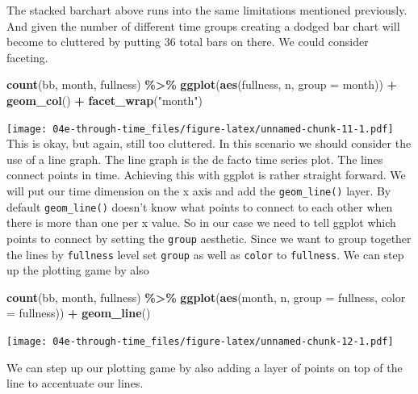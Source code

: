 \documentclass[
]{book}
\newenvironment{Shaded}{\begin{snugshade}}{\end{snugshade}}
\newcommand{\DataTypeTok}[1]{\textcolor[rgb]{0.13,0.29,0.53}{#1}}
\newcommand{\KeywordTok}[1]{\textcolor[rgb]{0.13,0.29,0.53}{\textbf{#1}}}
\newcommand{\NormalTok}[1]{#1}
\newcommand{\OperatorTok}[1]{\textcolor[rgb]{0.81,0.36,0.00}{\textbf{#1}}}
\newcommand{\StringTok}[1]{\textcolor[rgb]{0.31,0.60,0.02}{#1}}
\begin{document}
The stacked barchart above runs into the same limitations mentioned previously. And given the number of different time groups creating a dodged bar chart will become to cluttered by putting 36 total bars on there. We could consider faceting.

\begin{Shaded}
\begin{Highlighting}[]
\KeywordTok{count}\NormalTok{(bb, month, fullness) }\OperatorTok{\%\textgreater{}\%}\StringTok{ }
\StringTok{  }\KeywordTok{ggplot}\NormalTok{(}\KeywordTok{aes}\NormalTok{(fullness, n, }\DataTypeTok{group =}\NormalTok{ month)) }\OperatorTok{+}
\StringTok{  }\KeywordTok{geom\_col}\NormalTok{() }\OperatorTok{+}\StringTok{ }
\StringTok{  }\KeywordTok{facet\_wrap}\NormalTok{(}\StringTok{"month"}\NormalTok{)}
\end{Highlighting}
\end{Shaded}

\texttt{[image: 04e-through-time\_files/figure-latex/unnamed-chunk-11-1.pdf]}
This is okay, but again, still too cluttered. In this scenario we should consider the use of a line graph. The line graph is the de facto time series plot. The lines connect points in time. Achieving this with ggplot is rather straight forward. We will put our time dimension on the x axis and add the \texttt{geom\_line()} layer. By default \texttt{geom\_line()} doesn't know what points to connect to each other when there is more than one per x value. So in our case we need to tell ggplot which points to connect by setting the \texttt{group} aesthetic. Since we want to group together the lines by \texttt{fullness} level set \texttt{group} as well as \texttt{color} to \texttt{fullness}. We can step up the plotting game by also

\begin{Shaded}
\begin{Highlighting}[]
\KeywordTok{count}\NormalTok{(bb, month, fullness) }\OperatorTok{\%\textgreater{}\%}\StringTok{ }
\StringTok{  }\KeywordTok{ggplot}\NormalTok{(}\KeywordTok{aes}\NormalTok{(month, n, }\DataTypeTok{group =}\NormalTok{ fullness, }\DataTypeTok{color =}\NormalTok{ fullness)) }\OperatorTok{+}
\StringTok{  }\KeywordTok{geom\_line}\NormalTok{()}
\end{Highlighting}
\end{Shaded}

\texttt{[image: 04e-through-time\_files/figure-latex/unnamed-chunk-12-1.pdf]}

We can step up our plotting game by also adding a layer of points on top of the line to accentuate our lines.
\end{document}
